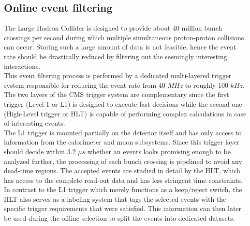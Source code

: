 \subsection{Online event filtering}
The Large Hadron Collider is designed to provide about 40 million bunch crossings per second during which multiple simultaneous proton-proton collisions can occur. Storing such a large amount of data is not feasible, hence the event rate should be drastically reduced by filtering out the seemingly interesting interactions. 
\\
This event filtering process is performed by a dedicated multi-layered trigger system responsible for reducing the event rate from 40 $\unit{MHz}$ to roughly 100 $\unit{kHz}$. The two layers of the CMS trigger system are complementary since the first trigger (Level-1 or L1) is designed to execute fast decisions while the second one (High-Level trigger or HLT) is capable of performing complex calculations in case of interesting events.
\\
The L1 trigger is mounted partially on the detector itself and has only access to information from the calorimeter and muon subsystems. Since this trigger layer should decide within 3.2 $\unit{\mu s}$ whether an events looks promising enough to be analyzed further, the processing of each bunch crossing is pipelined to avoid any dead-time regions. The accepted events are studied in detail by the HLT, which has access to the complete read-out data and has less stringent time constraints. In contrast to the L1 trigger which merely functions as a keep/reject switch, the HLT also serves as a labeling system that tags the selected events with the specific trigger requirements that were satisfied. This information can then later be used during the offline selection to split the events into dedicated datasets.

